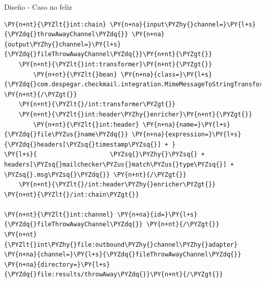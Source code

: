 \documentclass{beamer}
\begin{document}
\begin{frame}[fragile]{Diseño - Caso no feliz}
\begin{Verbatim}[fontsize=\tiny,commandchars=\\\{\}]
\PY{n+nt}{\PYZlt{}int:chain} \PY{n+na}{input\PYZhy{}channel=}\PY{l+s}{\PYZdq{}throwAwayChannel\PYZdq{}} \PY{n+na}{output\PYZhy{}channel=}\PY{l+s}{\PYZdq{}fileThrowAwayChannel\PYZdq{}}\PY{n+nt}{\PYZgt{}}
    \PY{n+nt}{\PYZlt{}int:transformer}\PY{n+nt}{\PYZgt{}}
        \PY{n+nt}{\PYZlt{}bean} \PY{n+na}{class=}\PY{l+s}{\PYZdq{}com.despegar.checkmail.integration.MimeMessageToStringTransformer\PYZdq{}} \PY{n+nt}{/\PYZgt{}}
    \PY{n+nt}{\PYZlt{}/int:transformer\PYZgt{}}
    \PY{n+nt}{\PYZlt{}int:header\PYZhy{}enricher}\PY{n+nt}{\PYZgt{}}
        \PY{n+nt}{\PYZlt{}int:header} \PY{n+na}{name=}\PY{l+s}{\PYZdq{}file\PYZus{}name\PYZdq{}} \PY{n+na}{expression=}\PY{l+s}{\PYZdq{}headers[\PYZsq{}timestamp\PYZsq{}] + }
\PY{l+s}{                    \PYZsq{}\PYZhy{}\PYZsq{} + headers[\PYZsq{}mailchecker\PYZus{}match\PYZus{}type\PYZsq{}] + \PYZsq{}.msg\PYZsq{}\PYZdq{}} \PY{n+nt}{/\PYZgt{}}
    \PY{n+nt}{\PYZlt{}/int:header\PYZhy{}enricher\PYZgt{}}
\PY{n+nt}{\PYZlt{}/int:chain\PYZgt{}}

\PY{n+nt}{\PYZlt{}int:channel} \PY{n+na}{id=}\PY{l+s}{\PYZdq{}fileThrowAwayChannel\PYZdq{}} \PY{n+nt}{/\PYZgt{}}
\PY{n+nt}{\PYZlt{}int\PYZhy{}file:outbound\PYZhy{}channel\PYZhy{}adapter} \PY{n+na}{channel=}\PY{l+s}{\PYZdq{}fileThrowAwayChannel\PYZdq{}} \PY{n+na}{directory=}\PY{l+s}{\PYZdq{}file:results/throwAway\PYZdq{}}\PY{n+nt}{/\PYZgt{}}
\end{Verbatim}
\end{frame}
\end{document}

